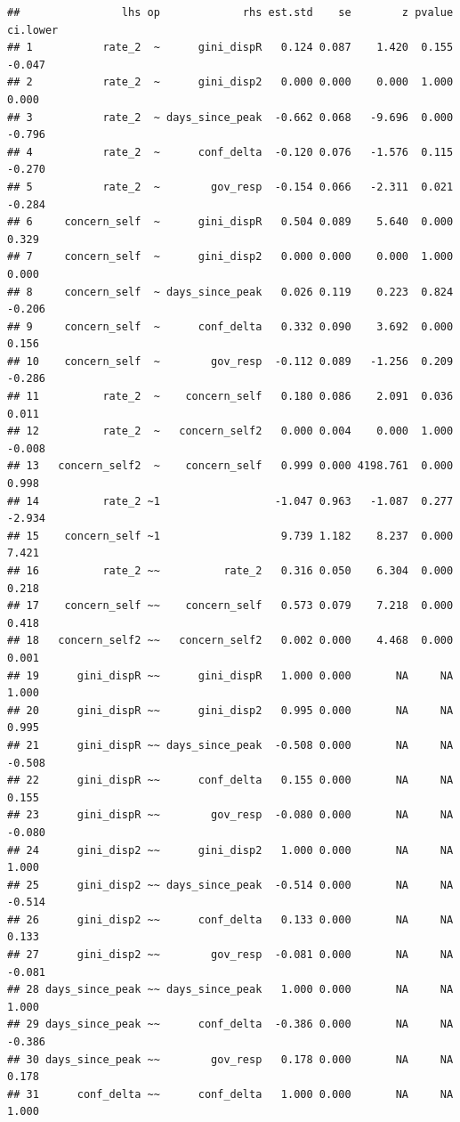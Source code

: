 \documentclass[
]{article}
\begin{document}
\begin{verbatim}
##                lhs op             rhs est.std    se        z pvalue ci.lower
## 1           rate_2  ~      gini_dispR   0.124 0.087    1.420  0.155   -0.047
## 2           rate_2  ~      gini_disp2   0.000 0.000    0.000  1.000    0.000
## 3           rate_2  ~ days_since_peak  -0.662 0.068   -9.696  0.000   -0.796
## 4           rate_2  ~      conf_delta  -0.120 0.076   -1.576  0.115   -0.270
## 5           rate_2  ~        gov_resp  -0.154 0.066   -2.311  0.021   -0.284
## 6     concern_self  ~      gini_dispR   0.504 0.089    5.640  0.000    0.329
## 7     concern_self  ~      gini_disp2   0.000 0.000    0.000  1.000    0.000
## 8     concern_self  ~ days_since_peak   0.026 0.119    0.223  0.824   -0.206
## 9     concern_self  ~      conf_delta   0.332 0.090    3.692  0.000    0.156
## 10    concern_self  ~        gov_resp  -0.112 0.089   -1.256  0.209   -0.286
## 11          rate_2  ~    concern_self   0.180 0.086    2.091  0.036    0.011
## 12          rate_2  ~   concern_self2   0.000 0.004    0.000  1.000   -0.008
## 13   concern_self2  ~    concern_self   0.999 0.000 4198.761  0.000    0.998
## 14          rate_2 ~1                  -1.047 0.963   -1.087  0.277   -2.934
## 15    concern_self ~1                   9.739 1.182    8.237  0.000    7.421
## 16          rate_2 ~~          rate_2   0.316 0.050    6.304  0.000    0.218
## 17    concern_self ~~    concern_self   0.573 0.079    7.218  0.000    0.418
## 18   concern_self2 ~~   concern_self2   0.002 0.000    4.468  0.000    0.001
## 19      gini_dispR ~~      gini_dispR   1.000 0.000       NA     NA    1.000
## 20      gini_dispR ~~      gini_disp2   0.995 0.000       NA     NA    0.995
## 21      gini_dispR ~~ days_since_peak  -0.508 0.000       NA     NA   -0.508
## 22      gini_dispR ~~      conf_delta   0.155 0.000       NA     NA    0.155
## 23      gini_dispR ~~        gov_resp  -0.080 0.000       NA     NA   -0.080
## 24      gini_disp2 ~~      gini_disp2   1.000 0.000       NA     NA    1.000
## 25      gini_disp2 ~~ days_since_peak  -0.514 0.000       NA     NA   -0.514
## 26      gini_disp2 ~~      conf_delta   0.133 0.000       NA     NA    0.133
## 27      gini_disp2 ~~        gov_resp  -0.081 0.000       NA     NA   -0.081
## 28 days_since_peak ~~ days_since_peak   1.000 0.000       NA     NA    1.000
## 29 days_since_peak ~~      conf_delta  -0.386 0.000       NA     NA   -0.386
## 30 days_since_peak ~~        gov_resp   0.178 0.000       NA     NA    0.178
## 31      conf_delta ~~      conf_delta   1.000 0.000       NA     NA    1.000

\end{verbatim}
\end{document}
